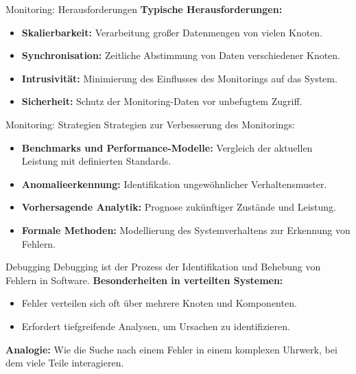 \documentclass{beamer}
\begin{document}
\begin{frame}{Monitoring: Herausforderungen}
    \textbf{Typische Herausforderungen:}
    \begin{itemize}
        \item \textbf{Skalierbarkeit:} Verarbeitung großer Datenmengen von vielen Knoten.
        \item \textbf{Synchronisation:} Zeitliche Abstimmung von Daten verschiedener Knoten.
        \item \textbf{Intrusivität:} Minimierung des Einflusses des Monitorings auf das System.
        \item \textbf{Sicherheit:} Schutz der Monitoring-Daten vor unbefugtem Zugriff.
    \end{itemize}
\end{frame}

\begin{frame}{Monitoring: Strategien}
    Strategien zur Verbesserung des Monitorings:
    \begin{itemize}
        \item \textbf{Benchmarks und Performance-Modelle:} Vergleich der aktuellen Leistung mit definierten Standards.
        \item \textbf{Anomalieerkennung:} Identifikation ungewöhnlicher Verhaltensmuster.
        \item \textbf{Vorhersagende Analytik:} Prognose zukünftiger Zustände und Leistung.
        \item \textbf{Formale Methoden:} Modellierung des Systemverhaltens zur Erkennung von Fehlern.
    \end{itemize}
\end{frame}

\begin{frame}{Debugging}
    Debugging ist der Prozess der Identifikation und Behebung von Fehlern in Software. \newline
    \textbf{Besonderheiten in verteilten Systemen:}
    \begin{itemize}
        \item Fehler verteilen sich oft über mehrere Knoten und Komponenten.
        \item Erfordert tiefgreifende Analysen, um Ursachen zu identifizieren.
    \end{itemize}
    \textbf{Analogie:} Wie die Suche nach einem Fehler in einem komplexen Uhrwerk, bei dem viele Teile interagieren.
\end{frame}
\end{document}

